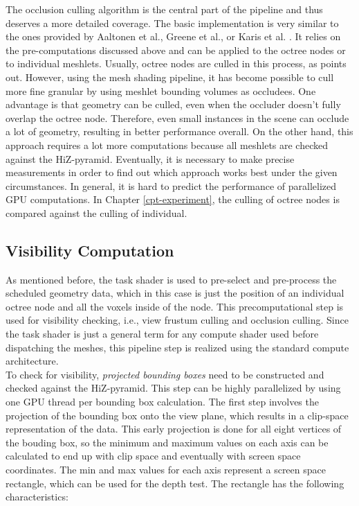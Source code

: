 The occlusion culling algorithm is the central part of the pipeline and thus deserves a more detailed coverage. The 
basic implementation is very similar to the ones provided by Aaltonen et al., Greene et al., or Karis et al. 
\cite{Aaltonen2015,Greene93,Karis2021}. It relies on the pre-computations discussed above and can be applied to the 
octree nodes or to individual meshlets. Usually, octree nodes are culled in this process, as \cite{AkenineMoeller2018}
points out. However, using the mesh shading pipeline, it has become possible to cull more fine granular by using 
meshlet bounding volumes as occludees. One advantage is that geometry can be culled, even when the occluder doesn't 
fully overlap the octree node. Therefore, even small instances in the scene can occlude a lot of geometry, resulting 
in better performance overall. On the other hand, this approach requires a lot more computations because all meshlets 
are checked against the \ac{HiZ}-pyramid. Eventually, it is necessary to make precise measurements in order to find out 
which approach works best under the given circumstances. In general, it is hard to predict the performance of 
parallelized \ac{GPU} computations. In Chapter \ref{cpt-experiment}, the culling of octree nodes is compared against the 
culling of individual.


\subsection*{Visibility Computation} \label{subsec-visibility-computation}

As mentioned before, the task shader is used to pre-select and pre-process the scheduled geometry data, 
which in this case is just the position of an individual octree node and all the voxels inside of the node. 
This precomputational step is used for visibility checking, i.e., view frustum culling and occlusion culling. 
Since the task shader is just a general term for any compute shader used before dispatching the meshes, 
this pipeline step is realized using the standard compute architecture. \\

To check for visibility, \emph{projected bounding boxes} need to be constructed and checked against the 
\ac{HiZ}-pyramid. This step can be highly parallelized by using one \ac{GPU} thread per bounding box 
calculation. The first step involves the projection of the bounding box onto the view plane, which results 
in a clip-space representation of the data. This early projection is done for all eight vertices of the 
bouding box, so the minimum and maximum values on each axis can be calculated to end up with clip space 
and eventually with screen space coordinates. The min and max values for each axis represent a screen 
space rectangle, which can be used for the depth test. The rectangle has the following characteristics:

